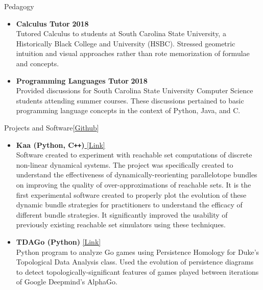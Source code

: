 \documentclass{resume} %
\begin{document}
\begin{rSection}{Pedagogy}
  \begin{itemize}[leftmargin=*]
    \item {\bf Calculus Tutor} \hfill {\bf 2018} \\
    Tutored Calculus to students at South Carolina State University, a Historically Black College and University (HSBC). Stressed geometric intuition and visual approaches rather than rote memorization of formulae and concepts.

    \item {\bf Programming Languages Tutor} \hfill {\bf 2018} \\
    Provided discussions for South Carolina State University Computer Science students attending summer courses. These discussions pertained to basic programming language concepts in the context of Python, Java, and C. \\
  \end{itemize}
\end{rSection}

\begin{rSection}{Projects and Software[\href{https://github.com/ekim1919}{Github}]}
  \begin{itemize}[leftmargin=*]
    \item {\bf Kaa (Python, C\verb!++!)}\href{https://github.com/Tarheel-Formal-Methods/kaa-dynamic}{ [Link] } \\
        Software created to experiment with reachable set computations of discrete non-linear dynamical systems. The project was specifically created to understand the effectiveness of dynamically-reorienting parallelotope bundles on improving the quality of over-approximations of reachable sets. It is the first experimental software created to properly plot the evolution of these dynamic bundle strategies for practitioners to understand the efficacy of different bundle strategies. It significantly improved the usability of previously existing reachable set simulators using these techniques.

    \item
        {\bf TDAGo (Python)} \href{https://github.com/ekim1919/TDAGo}{ [Link] }\\
        Python program to analyze Go games using Persistence Homology for Duke's Topological Data Analysis class. Used the evolution of persistence diagrams to detect topologically-significant features of games played between iterations of Google Deepmind's AlphaGo. \newline

  \end{itemize}
\end{rSection}
\end{document}
